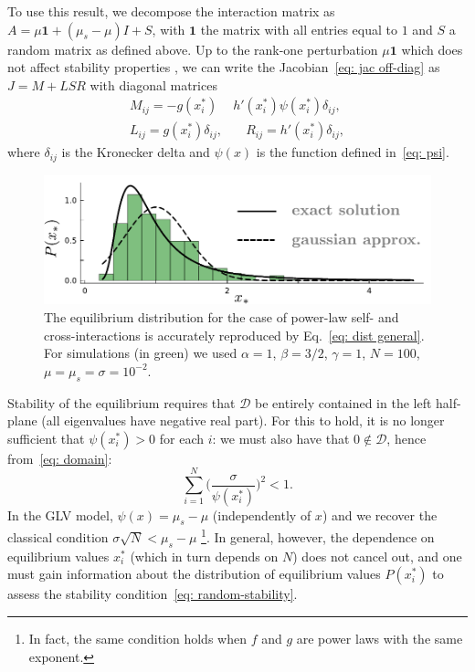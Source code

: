 \documentclass[
 pre,
 twocolumn,
 amsmath,
 amssymb,
 aps,
]{revtex4-2}
\begin{document}
To use this result, we decompose the interaction matrix as $A = \mu\mathbf{1} + (\mu_s-\mu)I + S$,
with $\mathbf{1}$ the matrix with all entries equal to $1$ and $S$ a random matrix as defined above.
Up to the rank-one perturbation $\mu\mathbf{1}$ which does not affect stability properties \cite{Stone2018}, we can write the Jacobian~\eqref{eq: jac off-diag} as $J = M + LSR$ with diagonal matrices
\begin{align}
    M_{ij} = - g(x_i^*)&h'(x_i^*)\psi(x_i^*)\delta_{ij}, \nonumber \\ 
    L_{ij} = g(x_i^*)\delta_{ij}, & \quad R_{ij} = h'(x_i^*)\delta_{ij}, 
\end{align}
where $\delta_{ij}$ is the Kronecker delta and $\psi(x)$ is the function defined in~\eqref{eq: psi}.
\begin{figure}[t!]
    \includegraphics[width=.45\textwidth]{cavity.pdf}
    \caption{The equilibrium distribution for the case of power-law self- and cross-interactions is accurately reproduced by Eq.~\eqref{eq: dist general}.
    For simulations (in green) we used $\alpha=1$, $\beta=3/2$,
    $\gamma=1$, $N=100$, $\mu=\mu_s=\sigma=10^{-2}$.}
    \label{fig: cavity sol.}
\end{figure}
Stability of the equilibrium requires that $\mathcal{D}$ be entirely contained in the left half-plane (all eigenvalues have negative real part). For this to hold, it is no longer sufficient that $\psi(x_i^*) > 0$ for each $i$: we must also have that $0\notin \mathcal{D}$, hence from~\eqref{eq: domain}:
\begin{equation}
    \sum_{i=1}^N \Big(\frac{\sigma}{\psi(x_i^*)}\Big)^{2}
    < 1.
    \label{eq: random-stability}
\end{equation}
In the GLV model, $\psi(x) = \mu_s - \mu$ (independently of $x$) and we recover the classical condition $\sigma\sqrt{N} < \mu_s - \mu$ \footnote{In fact, the same condition holds when $f$ and $g$ are power laws with the same exponent.}. In general, however, the dependence on equilibrium values $x_i^*$ (which in turn depends on $N$) does not cancel out, and one must gain information about the distribution of equilibrium values $P(x_i^*)$ to assess the stability condition~\eqref{eq: random-stability}.

\end{document}
